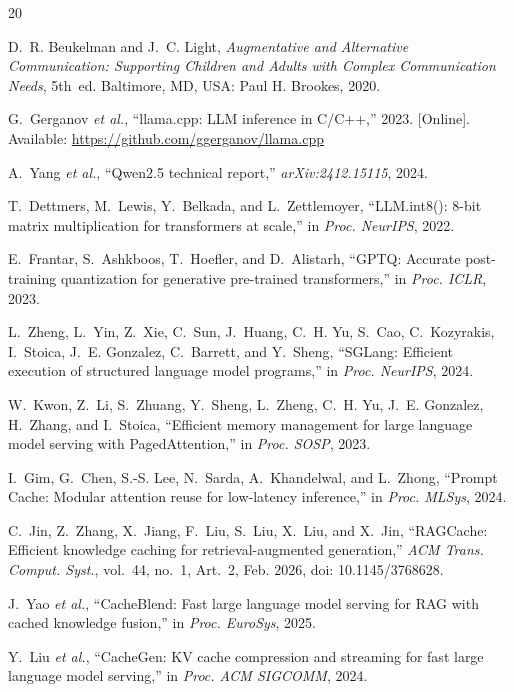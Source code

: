 \documentclass[conference]{IEEEtran}
\begin{document}
\begin{thebibliography}{20}
\footnotesize
\setlength{\itemsep}{1.5pt}

D.~R. Beukelman and J.~C. Light, \emph{Augmentative and Alternative Communication: Supporting Children and Adults with Complex Communication Needs}, 5th~ed. Baltimore, MD, USA: Paul H. Brookes, 2020.

G.~Gerganov \emph{et al.}, ``llama.cpp: LLM inference in C/C++,'' 2023. [Online]. Available: \url{https://github.com/ggerganov/llama.cpp}

A.~Yang \emph{et al.}, ``Qwen2.5 technical report,'' \emph{arXiv:2412.15115}, 2024.

T.~Dettmers, M.~Lewis, Y.~Belkada, and L.~Zettlemoyer, ``LLM.int8(): 8-bit matrix multiplication for transformers at scale,'' in \emph{Proc. NeurIPS}, 2022.

E.~Frantar, S.~Ashkboos, T.~Hoefler, and D.~Alistarh, ``GPTQ: Accurate post-training quantization for generative pre-trained transformers,'' in \emph{Proc. ICLR}, 2023.

L.~Zheng, L.~Yin, Z.~Xie, C.~Sun, J.~Huang, C.~H. Yu, S.~Cao, C.~Kozyrakis, I.~Stoica, J.~E. Gonzalez, C.~Barrett, and Y.~Sheng, ``SGLang: Efficient execution of structured language model programs,'' in \emph{Proc. NeurIPS}, 2024.

W.~Kwon, Z.~Li, S.~Zhuang, Y.~Sheng, L.~Zheng, C.~H. Yu, J.~E. Gonzalez, H.~Zhang, and I.~Stoica, ``Efficient memory management for large language model serving with PagedAttention,'' in \emph{Proc. SOSP}, 2023.

I.~Gim, G.~Chen, S.-S. Lee, N.~Sarda, A.~Khandelwal, and L.~Zhong, ``Prompt Cache: Modular attention reuse for low-latency inference,'' in \emph{Proc. MLSys}, 2024.

C.~Jin, Z.~Zhang, X.~Jiang, F.~Liu, S.~Liu, X.~Liu, and X.~Jin, ``RAGCache: Efficient knowledge caching for retrieval-augmented generation,'' \emph{ACM Trans. Comput. Syst.}, vol.~44, no.~1, Art.~2, Feb. 2026, doi: 10.1145/3768628.

J.~Yao \emph{et al.}, ``CacheBlend: Fast large language model serving for RAG with cached knowledge fusion,'' in \emph{Proc. EuroSys}, 2025.

Y.~Liu \emph{et al.}, ``CacheGen: KV cache compression and streaming for fast large language model serving,'' in \emph{Proc. ACM SIGCOMM}, 2024.


\end{thebibliography}
\end{document}
